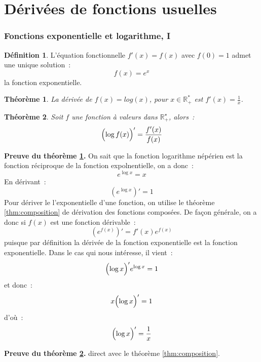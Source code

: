 \documentclass[10pt,notheorems]{beamer}
\theoremstyle{plain}
\newtheorem{theorem}{Théorème}
\theoremstyle{definition} %
\newtheorem{definition}{Définition}
\begin{document}
\section{Dérivées de fonctions usuelles}


\begin{frame}
  \frametitle{Fonctions exponentielle et logarithme, I}
  \hypertarget{slide_derivee_exp_log_1}{}

  \begin{definition}
    L'équation fonctionnelle $f'(x) = f(x)$ avec $f(0)=1$ admet une unique solution~:
    \[
      f(x) = e^x
    \]
    la fonction exponentielle.
  \end{definition}

  \bigskip

  \begin{theorem}\label{thm:log_derivee_1}
    La dérivée de $f(x) = log(x)$, pour $x\in\mathbb R_+^*$ est $f'(x) = \frac{1}{x}$.
  \end{theorem}

  \bigskip

  \begin{theorem}\label{thm:log_derivee_2}
    Soit $f$ une fonction à valeurs dans $\mathbb R_+^{\star}$, alors~:
    \[
      \Bigl(\log f(x)\Bigr)' = \frac{f'(x)}{f(x)}
    \]
  \end{theorem}

\end{frame}


\begin{notes}

  \textbf{Preuve du théorème \hyperlink{slide_derivee_exp_log_1}{\ref{thm:log_derivee_1}}.} On sait que la fonction logarithme népérien est la fonction réciproque de la fonction expolnentielle, on a donc~:
  \[
    e^{\log x} = x
  \]
  En dérivant~:
  \[
    \left(e^{\log x}\right)' = 1
  \]
  Pour dériver le l'exponentielle d'une fonction, on utilise le théorème \hyperlink{slide_derivee_composition_1}{\ref{thm:composition}} de dérivation des fonctions composées. De façon générale, on a donc si $f(x)$ est une fonction dérivable~:
  \[
    \left(e^{f(x)}\right)' = f'(x)e^{f(x)}
  \]
  puisque par définition la dérivée de la fonction exponentielle est la fonction exponentielle. Dans le cas qui nous intéresse, il vient~:
  \[
    \Bigl( \log x \Bigr)' e^{\log x} = 1
  \]
  et donc~:
  \[
    x \Bigl( \log x \Bigr)' = 1
  \]
  d'où~:
  \[
    \Bigl( \log x \Bigr)' = \frac{1}{x}
  \]

  \bigskip

  \textbf{Preuve du théorème \hyperlink{slide_derivee_exp_log_1}{\ref{thm:log_derivee_2}}.} direct avec le théorème \hyperlink{slide_derivee_composition_1}{\ref{thm:composition}}.

\end{notes}
\end{document}
